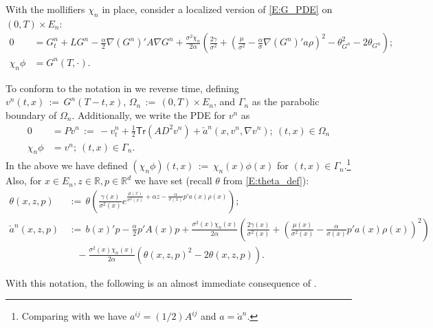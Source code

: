 \documentclass[11pt, letterpaper]{amsart}
\theoremstyle{definition}
\theoremstyle{remark}
\numberwithin{equation}{section}
\newcommand{\reals}{\mathbb R}
\newcommand{\dfn}{\, := \,}
\newcommand{\tr}{\mathsf{Tr}}
\begin{document}
With the mollifiers $\chi_n$ in place, consider a localized version of \eqref{E:G_PDE} on $(0,T)\times E_n$:
\begin{equation}\label{E:G_PDE_local}
\begin{split}
0 & = G^n_t + LG^n - \frac{\alpha}{2}\nabla (G^n)'A\nabla G^n + \frac{\sigma^2\chi_n}{2\alpha}\left(\frac{2\gamma}{\sigma^2} + \left(\frac{\mu}{\sigma^2} - \frac{\alpha}{\sigma}\nabla (G^n)'a\rho\right)^2 -\theta_{G^n}^2 - 2\theta_{G^n}\right);\\
\chi_n\phi & = G^n(T,\cdot).
\end{split}
\end{equation}

To conform to the notation in \cite{MR1465184} we reverse time, defining $v^n(t,x)\dfn G^n(T-t,x)$, $\Omega_n \dfn (0,T)\times E_n$, and $\Gamma_n$ as the parabolic boundary of $\Omega_n$.  Additionally, we write the PDE for $v^n$ as
\begin{equation}\label{E:lieb_PDE_form}
\begin{split}
0 &= Pv^n \dfn -v^n_t + \frac{1}{2}\tr\left(AD^2 v^n\right) + \check{a}^n(x,v^n, \nabla v^n);\ (t,x) \in \Omega_n\\
\chi_n\phi & = v^n;\ (t,x)\in \Gamma_n.
\end{split}
\end{equation}
In the above we have defined $(\chi_n\phi)(t,x) \dfn \chi_n(x)\phi(x)$ for $(t,x)\in \Gamma_n$.\footnote{Comparing with \cite[Equation (12.2)]{MR1465184} we have $a^{ij} = (1/2)A^{ij}$ and $a=\check{a}^n$.} Also, for $x\in E_n,z\in\reals,p\in\reals^d$ we have set (recall $\theta$ from \eqref{E:theta_def}):
\begin{equation}\label{E:lieb_notation}
\begin{split}
\theta(x,z,p) & \dfn \theta\left(\frac{\gamma(x)}{\sigma^2(x)}e^{\frac{\mu(x)}{\sigma^2(x)} +\alpha z - \frac{\alpha}{\sigma(x)}p'a(x)\rho(x)}\right);\\
\check{a}^n(x,z,p) & \dfn b(x)'p - \frac{\alpha}{2}p'A(x) p + \frac{\sigma^2(x)\chi_n(x)}{2\alpha}\left(\frac{2\gamma(x)}{\sigma^2(x)} + \left(\frac{\mu(x)}{\sigma^2(x)} - \frac{\alpha}{\sigma(x)}p'a(x)\rho(x)\right)^2\right)\\
&\quad - \frac{\sigma^2(x)\chi_n(x)}{2\alpha}\left(\theta\left(x,z,p\right)^2 - 2\theta\left(x,z,p\right)\right).
\end{split}
\end{equation}

With this notation, the following is an almost immediate consequence of \cite[Theorem 12.16]{MR1465184}.
\end{document}
